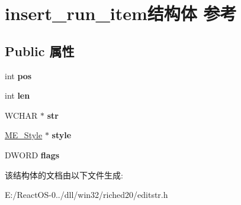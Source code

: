 \hypertarget{structinsert__run__item}{}\section{insert\+\_\+run\+\_\+item结构体 参考}
\label{structinsert__run__item}
\subsection*{Public 属性}
\begin{DoxyCompactItemize}
\item 
\mbox{\label{structinsert__run__item_a9b153ce6d863dbd6fa662d908051bb47}} 
int {\bfseries pos}
\item 
\mbox{\label{structinsert__run__item_ac65ae59324b90205d6851a1068d6456c}} 
int {\bfseries len}
\item 
\mbox{\label{structinsert__run__item_ab2593e7215c42922fc14c9bb48ccb401}} 
W\+C\+H\+AR $\ast$ {\bfseries str}
\item 
\mbox{\label{structinsert__run__item_a6db7339c5b614afb3fb44660f2c01107}} 
\hyperlink{structtag_m_e___style}{M\+E\+\_\+\+Style} $\ast$ {\bfseries style}
\item 
\mbox{\label{structinsert__run__item_a457328b6002b30ad385bef20d0893e94}} 
D\+W\+O\+RD {\bfseries flags}
\end{DoxyCompactItemize}


该结构体的文档由以下文件生成\+:\begin{DoxyCompactItemize}
\item 
E\+:/\+React\+O\+S-\/0../dll/win32/riched20/editstr.\+h\end{DoxyCompactItemize}

